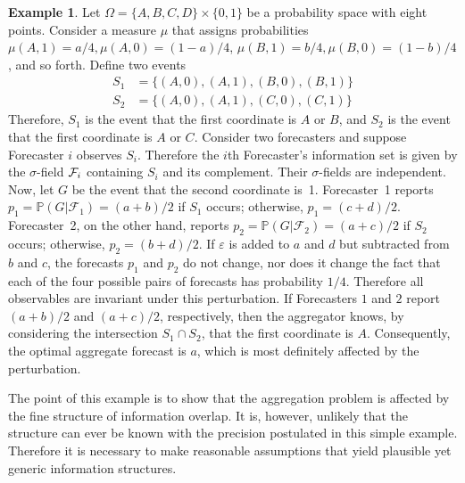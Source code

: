 \documentclass[12pt]{article}
\renewcommand{\P}{\mathbb{P}}
\theoremstyle{definition}
\newtheorem{example}[theorem]{Example}
\theoremstyle{definition}
\def\F{{\cal F}}
\def\P{{\mathbb P}}
\def\ee{\varepsilon}
\begin{document}
\begin{example}
Let $\Omega = \{ A,B,C,D \} \times \{ 0,1 \}$ be a probability space
with eight points.  Consider a measure $\mu$ that assigns
probabilities $\mu (A,1) = a/4, \mu (A,0) = (1-a)/4$, $\mu (B,1) =
b/4, \mu (B,0) = (1-b)/4$, and so forth. Define two events 
\begin{align*}
S_1 &= \{(A,0),(A,1),(B,0),(B,1) \}\\
S_2 &= \{(A,0),(A,1),(C,0),(C,1) \}
\end{align*}
 Therefore, $S_1$ is the event that the first coordinate is
$A$ or $B$, and $S_2$ is the event that the first coordinate
is $A$ or $C$. Consider two forecasters and suppose Forecaster $i$ observes $S_i$. Therefore the $i$th Forecaster's information set is
given by the $\sigma$-field $\F_i$ containing $S_i$ and its
complement. Their $\sigma$-fields are independent. Now, let
$G$ be the event that the second coordinate is~1.  Forecaster~1
reports $p_1 = \P(G | \mathcal{F}_1) = (a+b)/2$ if $S_1$ occurs;
otherwise, $p_1 = (c+d)/2$.  Forecaster~2, on the other hand, reports
$p_2 = \P(G | \mathcal{F}_2) = (a+c)/2$ if $S_2$ occurs; otherwise,
$p_2 = (b+d)/2$.  If $\ee$ is added to $a$ and $d$ but subtracted from
$b$ and $c$, the forecasts $p_1$ and $p_2$ do not change, nor does it
change the fact that each of the four possible pairs of forecasts has
probability $1/4$.  Therefore all observables are invariant under
this perturbation.  If Forecasters $1$ and $2$ report $(a+b)/2$ and
$(a+c)/2$, respectively, then the aggregator knows, by considering the
intersection $S_1 \cap S_2$, that the first coordinate is $A$.
Consequently, the optimal aggregate forecast is $a$, which is most
definitely affected by the perturbation.
\end{example}

The point of this example is to show that the aggregation problem is affected
by the fine structure of information overlap.  It is, however, unlikely
that the structure can ever be known with the precision postulated in
this simple example.  Therefore it is necessary to make reasonable
assumptions that yield plausible yet generic information structures.
\end{document}
